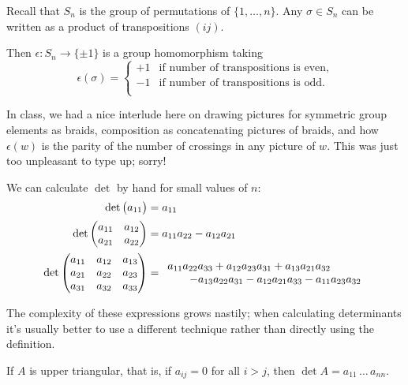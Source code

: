 Recall that $S_n$ is the group of permutations of $\{1,\ldots,n\}$.
Any $\sigma \in S_n$ can be written as a product of transpositions $(i j)$.

Then $\epsilon:S_n\to\{\pm1\}$ is a group homomorphism taking
\begin{equation*}
	\epsilon(\sigma) =
	\begin{cases}
		+1 & \text{if number of transpositions is even,} \\ %
		-1 & \text{if number of transpositions is odd.} \\ %
	\end{cases}
\end{equation*}

In class, we had a nice interlude here on drawing pictures for symmetric group elements as braids, composition as concatenating pictures of braids, and how $\epsilon(w)$ is the parity of the number of crossings in any picture of $w$. This was just too unpleasant to type up; sorry!


\begin{example}
	We can calculate $\det$ by hand for small values of $n$: %
	\begin{align*}
		\det \mat{a_{11}}
			&= a_{11} \\[1.5pt]
		\det \mat{a_{11} & a_{12} \\ a_{21} & a_{22}}
			&= a_{11} a_{22} - a_{12} a_{21} \\[1.5pt] %
		\det \mat{a_{11} & a_{12} & a_{13} \\ a_{21} & a_{22} & a_{23} \\ a_{31} & a_{32} & a_{33}}
			&=
			\begin{array}{l}
				a_{11} a_{22} a_{33}
				+ a_{12} a_{23} a_{31}
				+ a_{13} a_{21} a_{32} \\ \qquad
				- a_{13} a_{22} a_{31}
				- a_{12} a_{21} a_{33}
				- a_{11} a_{23} a_{32} %
			\end{array}
	\end{align*}
\end{example}
	The complexity of these expressions grows nastily; when calculating determinants it's usually better to use a different technique rather than directly using the definition. %


\begin{lemma}
	If $A$ is upper triangular, that is, if $a_{ij}=0$ for all $i>j$, then $\det A =a_{11}\,\ldots\,a_{nn}$. %
\end{lemma}

